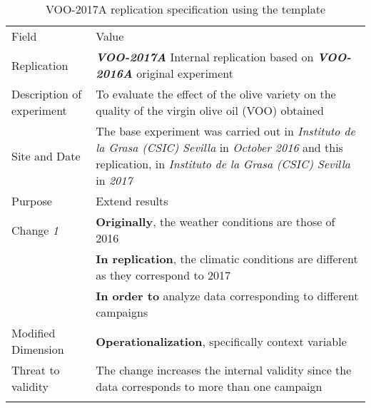 \begin{table*}[h]
  \caption{VOO-2017A replication specification using the template}
\label{tab:edi}
  \centering

\begin{tabularx}{\textwidth}{
  >{\hsize=0.25\hsize}X
  >{\hsize=0.8\hsize}X}
  
    \noalign{\smallskip}\hline\noalign{\smallskip}
  
  Field &  Value  \\ 
  \noalign{\smallskip}\hline\noalign{\smallskip}
 
 Replication &   \textbf{\emph{VOO-2017A}}   Internal replication based on \textbf{\emph{VOO-2016A}}  original experiment   \\
     
 Description \newline of experiment &  To evaluate the effect of the olive variety on the quality of the virgin olive oil (VOO) obtained \\  
 
 Site and Date & The base experiment was carried out in  \textit{Instituto de la Grasa (CSIC) Sevilla}  in  \textit{October 2016} and this replication, in  \textit{Instituto de la Grasa (CSIC) Sevilla} in \textit{2017}    \\
    Purpose  &  Extend results \\  
\hline   
    Change \textit{1}   & \textbf{Originally}, the weather conditions are those of 2016 \\& \textbf{In replication}, the climatic conditions are different as they correspond to 2017 \\& \textbf{In order to} analyze data corresponding to different campaigns  \\
    
     Modified Dimension & 
    \textbf{Operationalization}, specifically context variable \\   
    Threat to validity  & The change increases the internal validity since the data corresponds to more than one campaign \\  
    
	
   	\noalign{\smallskip\smallskip}\hline
	\end{tabularx}  
\end{table*}

